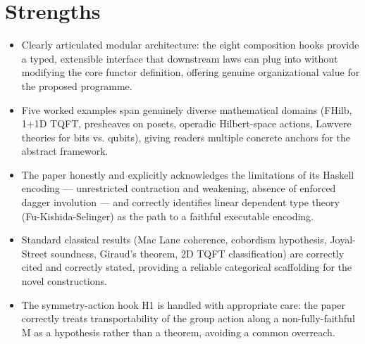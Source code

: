 \documentclass[11pt]{article}
\begin{document}
\section*{Strengths}
\begin{itemize}[leftmargin=*]
  \item Clearly articulated modular architecture: the eight composition hooks provide a typed, extensible interface that downstream laws can plug into without modifying the core functor definition, offering genuine organizational value for the proposed programme.
  \item Five worked examples span genuinely diverse mathematical domains (FHilb, 1+1D TQFT, presheaves on posets, operadic Hilbert-space actions, Lawvere theories for bits vs. qubits), giving readers multiple concrete anchors for the abstract framework.
  \item The paper honestly and explicitly acknowledges the limitations of its Haskell encoding — unrestricted contraction and weakening, absence of enforced dagger involution — and correctly identifies linear dependent type theory (Fu-Kishida-Selinger) as the path to a faithful executable encoding.
  \item Standard classical results (Mac Lane coherence, cobordism hypothesis, Joyal-Street soundness, Giraud's theorem, 2D TQFT classification) are correctly cited and correctly stated, providing a reliable categorical scaffolding for the novel constructions.
  \item The symmetry-action hook H1 is handled with appropriate care: the paper correctly treats transportability of the group action along a non-fully-faithful M as a hypothesis rather than a theorem, avoiding a common overreach.
\end{itemize}
\end{document}
